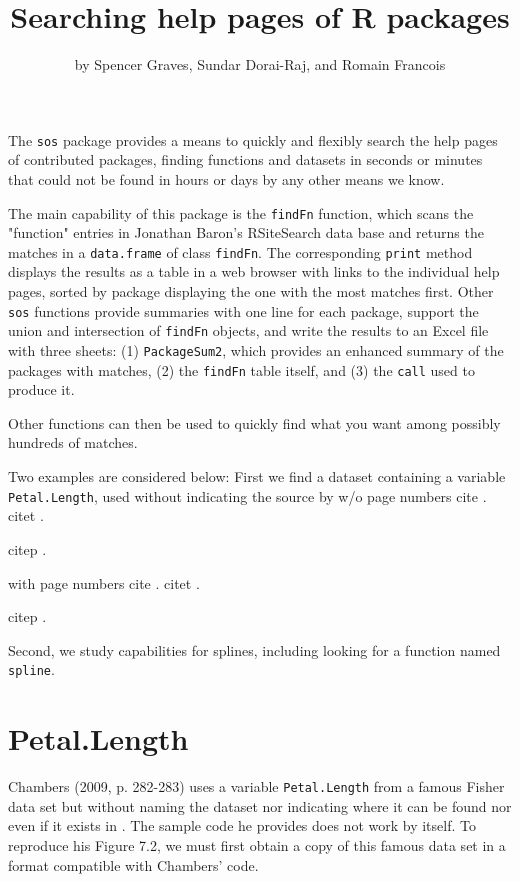 \title{Searching help pages of R packages}
\author{by Spencer Graves, Sundar Dorai-Raj, and Romain Francois}

\maketitle

The {\tt sos} package provides a means to quickly and flexibly 
search the help pages of contributed packages, finding 
functions and datasets in seconds or minutes that could not be
found in hours or days by any other means we know.

The main capability of this package is the {\tt findFn} function,
which scans the "function" entries in Jonathan 
Baron's RSiteSearch data base and returns the matches in a 
{\tt data.frame} of class {\tt findFn}.  The corresponding 
{\tt print} method displays the results as a table in a web 
browser with links to the individual help pages, sorted by package 
displaying the one with the most matches first.  Other {\tt sos} 
functions provide summaries with one line for each package, support 
the union and intersection of {\tt findFn} objects, and write the 
results to an Excel file with three sheets:  (1) {\tt PackageSum2}, 
which provides an enhanced summary of the packages with matches, 
(2) the {\tt findFn} table itself, and (3) the {\tt call} used to 
produce it.

Other \R{} functions can then be used to quickly find what you want
among possibly hundreds of matches.

Two examples are considered below:  First we find a dataset 
containing a variable {\tt Petal.Length}, used without indicating 
the source by
w/o page numbers
cite \cite{JC09}.
citet \citet{JC09}.

citep \citep{JC09}.

with page numbers
cite \cite[pp. 282-283]{JC09}.
citet \citet[pp. 282-283]{JC09}.

citep \citep[pp. 282-283]{JC09}.

Second, we study \R{} capabilities
for splines, including looking for a function named {\tt spline}.

\section*{Petal.Length}

\citep[pp. 282-283]{JC09} 
Chambers (2009, p. 282-283) uses a variable {\tt Petal.Length} from a
famous Fisher data set but without naming the dataset nor indicating
where it can be found nor even if it exists in \R{}.  The sample
code he provides does not work by itself.  To reproduce his
Figure 7.2, we must first obtain a copy of this famous data set
in a format compatible with Chambers' code.

